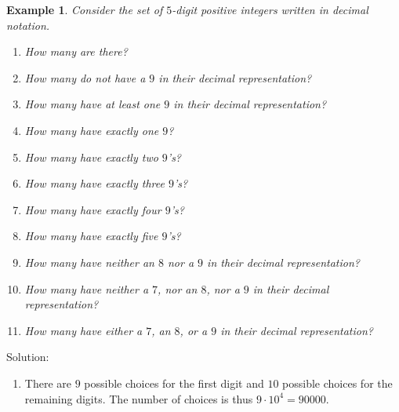 \documentclass[11pt, openany]{book}
\theoremstyle{change} \theoremheaderfont{\blue\sffamily\bfseries}
\newtheorem{exa}[thm]{Example}
\theoremstyle{nonumberplain} \theoremheaderfont{\sffamily\bfseries}
\newcommand{\í}{\'{\i}}
\begin{document}
\begin{exa}\label{exa:5digit_inclusion-exclusion}
Consider the set of $5$-digit  positive integers written in decimal
notation.
\begin{multicols}{2}\columnseprule 1pt \columnsep 25pt

\begin{enumerate}
\item How many are there?

  \item How many do not have a $9$ in
their decimal representation?
  \item How many have at least one
$9$ in their decimal representation?
 \item How many have
exactly one $9$?

  \item How many have exactly two $9$'s?

\item How many have exactly three $9$'s?

 \item How many have
exactly four $9$'s?

  \item How many have exactly five $9$'s?

\item How many have neither an $8$ nor a $9$ in their decimal
representation?


\item How many have neither a $7$, nor an $8$, nor a $9$ in their
decimal representation?



\item How many have either a $7$, an $8$, or a $9$ in their
decimal representation?


\end{enumerate}

\end{multicols}

 \end{exa} Solution: \begin{multicols}{2}\columnseprule 1pt \columnsep 25pt

\begin{enumerate}
\item  There are $9$ possible choices for the first digit and $10$
possible choices for the remaining digits. The number of choices is
thus $9\cdot10^4 = 90000$.


\end{enumerate}
\end{multicols}
\end{document}
